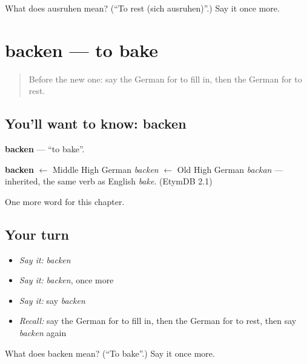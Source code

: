 \begin{tcolorbox}[breakable,colback=teal!4,colframe=teal!35!black,title={Before you move on}]
What does ausruhen mean? (\textquotedblleft{}To rest (sich ausruhen)\textquotedblright{}.) Say it once more.
\end{tcolorbox}
\section[backen]{backen — to bake}

\label{lesson:GE-C175-backen}



\begin{quote}
Before the new one: say the German for to fill in, then the German for to rest.
\end{quote}

\subsection*{You'll want to know: backen}
\textbf{backen} — \textquotedblleft{}to bake\textquotedblright{}.

\begin{cousinweb}
\textbf{backen} $\leftarrow$ Middle High German \emph{backen} $\leftarrow$ Old High German \emph{backan} — inherited, the same verb as English \emph{bake}. (EtymDB 2.1)
\end{cousinweb}

\begin{grammarlens}[title={What you've built}]
One more word for this chapter.
\end{grammarlens}

\subsection*{Your turn}
\begin{itemize}
\raggedright
  \item \emph{Say it:} \emph{backen}
  \item \emph{Say it:} \emph{backen}, once more
  \item \emph{Say it:} say \emph{backen}
  \item \emph{Recall:} say the German for to fill in, then the German for to rest, then say \emph{backen} again
\end{itemize}

\begin{tcolorbox}[breakable,colback=teal!4,colframe=teal!35!black,title={Before you move on}]
What does backen mean? (\textquotedblleft{}To bake\textquotedblright{}.) Say it once more.
\end{tcolorbox}
